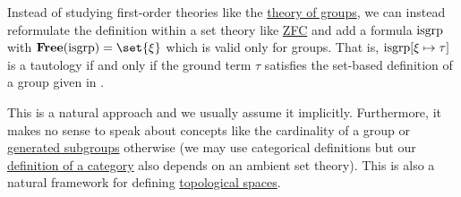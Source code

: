 \begin{remark}\label{rem:first_order_theories_in_zfc}
  Instead of studying first-order theories like the \hyperref[def:group/theory]{theory of groups}, we can instead reformulate the definition within a set theory like \hyperref[def:ZFC]{ZFC} and add a formula \( \operatorname{isgrp} \) with \( \boldop{Free}(\op{isgrp}) = \set{ \xi } \) which is valid only for groups. That is, \( \operatorname{isgrp}[\xi \mapsto \tau] \) is a tautology if and only if the ground term \( \tau \) satisfies the set-based definition of a group given in .

  This is a natural approach and we usually assume it implicitly. Furthermore, it makes no sense to speak about concepts like the cardinality of a group or \hyperref[def:first_order_generated_substructure]{generated subgroups} otherwise (we may use categorical definitions but our \hyperref[def:category]{definition of a category} also depends on an ambient set theory). This is also a natural framework for defining \hyperref[def:topological_space]{topological spaces}.
\end{remark}
